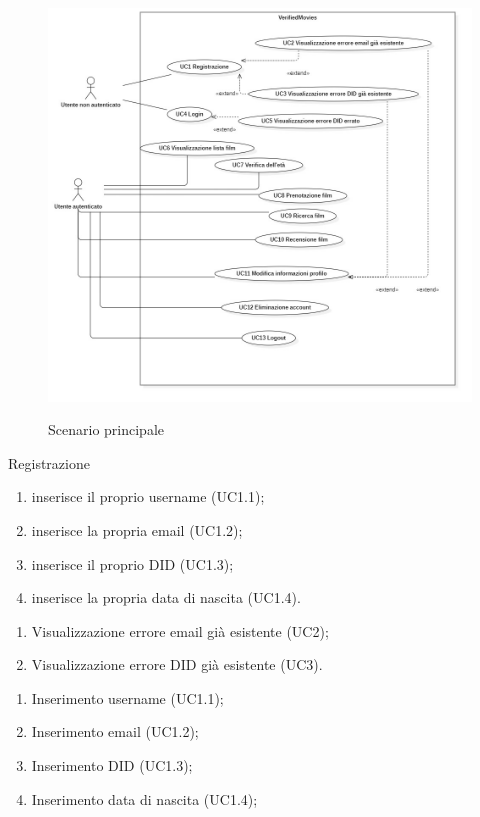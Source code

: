 \begin{figure}[!ht] 
    \centering 
    \includegraphics[width=0.9\columnwidth, alt={Scenario principale dei vari casi d'uso individuati}]{immagini/usecase/scenario-principale.jpg}
    \caption{Scenario principale}\label{fig:usecase-scenario-principale}
\end{figure}

\begin{usecase}{1}{Registrazione}\label{uc:registrazione}

\begin{enumerate}
  \item inserisce il proprio username (UC1.1);
  \item inserisce la propria email (UC1.2);
  \item inserisce il proprio DID (UC1.3);
  \item inserisce la propria data di nascita (UC1.4).
\end{enumerate}

\usecaseext{}
\begin{enumerate}
  \item Visualizzazione errore email già esistente (UC2);
  \item Visualizzazione errore DID già esistente (UC3).
\end{enumerate}

\begin{enumerate}
  \item Inserimento username (UC1.1);
  \item Inserimento email (UC1.2);
  \item Inserimento DID (UC1.3);
  \item Inserimento data di nascita (UC1.4);
\end{enumerate}
\end{usecase}

